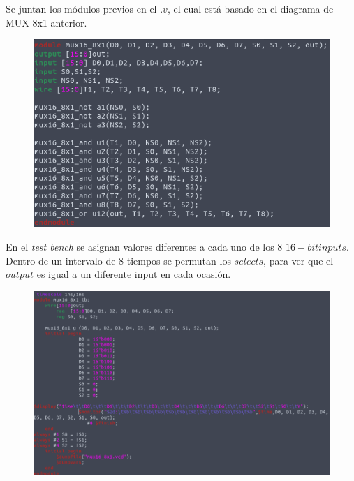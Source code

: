 \documentclass[11pt,a4paper]{article}
\begin{document}
\begin{enumerate}
\begin{enumerate}[label=(\alph*)]
Se juntan los módulos previos en el $.v$, el cual está basado en el diagrama de MUX 8x1 anterior.
\begin{figure}[h!]
\centering
\includegraphics[scale=0.4]{16_8x1MUX_4.png} 
\end{figure}

En el \textit{test bench} se asignan valores diferentes a cada uno de los 8 $16-bit inputs$. Dentro de un intervalo de 8 tiempos se permutan los $selects$, para ver que el $output$ es igual a un diferente input en cada ocasión.
\begin{figure}[h!]
\centering
\includegraphics[scale=0.35]{16_8x1MUX_5.png} 
\end{figure}


\end{enumerate}
\end{enumerate}
\end{document}
